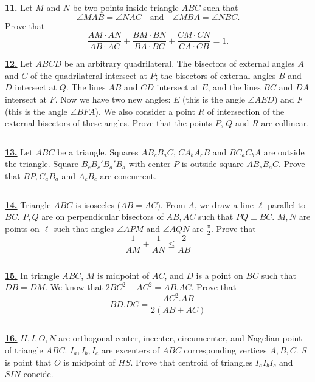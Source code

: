 \documentclass{article}
\begin{document}
$$ $$

\href{http://www.artofproblemsolving.com/Forum/viewtopic.php?p=124397#p124397}{\bf 11.} Let $ M$ and $ N$ be two points inside triangle $ ABC$ such that
$$ \angle MAB = \angle NAC\quad \mbox{and}\quad \angle MBA = \angle NBC.$$
Prove that
$$ \frac {AM \cdot AN}{AB \cdot AC} + \frac {BM \cdot BN}{BA \cdot BC} + \frac {CM \cdot CN}{CA \cdot CB} = 1.$$

\href{http://www.artofproblemsolving.com/Forum/viewtopic.php?p=191489#p191489}{\bf 12.} Let $ABCD$ be an arbitrary quadrilateral. The bisectors of external angles $A$ and $C$ of the quadrilateral intersect at $P$; the bisectors of external angles $B$ and $D$ intersect at $Q$. The lines $AB$ and $CD$ intersect at $E$, and the lines $BC$ and $DA$ intersect at $F$. Now we have two new angles: $E$ (this is the angle $\angle{AED}$) and $F$ (this is the angle $\angle{BFA}$). We also consider a point $R$ of intersection of the external bisectors of these angles. Prove that the points $P$, $Q$ and $R$ are collinear.

$$ $$

\href{http://www.artofproblemsolving.com/Forum/viewtopic.php?p=916020#p916020}{\bf 13.} Let $ ABC$ be a triangle. Squares $ AB_{c}B_{a}C$, $ CA_{b}A_{c}B$ and $ BC_{a}C_{b}A$ are outside the triangle. Square $ B_{c}B_{c}'B_{a}'B_{a}$ with center $ P$ is outside square $ AB_{c}B_{a}C$. Prove that $ BP,C_{a}B_{a}$ and $ A_{c}B_{c}$ are concurrent.

$$ $$

\href{http://www.artofproblemsolving.com/Forum/viewtopic.php?p=852412#p852412}{\bf 14.} Triangle $ABC$ is isosceles ($AB=AC$). From $A$, we draw a line $\ell$ parallel to $BC$. $P,Q$ are on perpendicular bisectors of $AB,AC$ such that $PQ\perp BC$. $M,N$ are points on $\ell$ such that angles $\angle APM$ and $\angle AQN$ are $\frac\pi2$. Prove that
$$\frac{1}{AM}+\frac1{AN}\leq\frac2{AB}$$


$$ $$

\href{http://www.artofproblemsolving.com/Forum/viewtopic.php?p=835050#p835050}{\bf 15.} In triangle $ABC$, $M$ is midpoint of $AC$, and $D$ is a point on $BC$ such that $DB=DM$. We know that $2BC^{2}-AC^{2}=AB.AC$. Prove that \[BD.DC=\frac{AC^{2}.AB}{2(AB+AC)}\]

$$ $$

\href{http://www.artofproblemsolving.com/Forum/viewtopic.php?p=641483#p641483}{\bf 16.} $H,I,O,N$ are orthogonal center, incenter, circumcenter, and Nagelian point of triangle $ABC$. $I_{a},I_{b},I_{c}$ are excenters of $ABC$ corresponding vertices $A,B,C$. $S$ is point that $O$ is midpoint of $HS$. Prove that centroid of triangles $I_{a}I_{b}I_{c}$ and $SIN$ concide.
\end{document}
